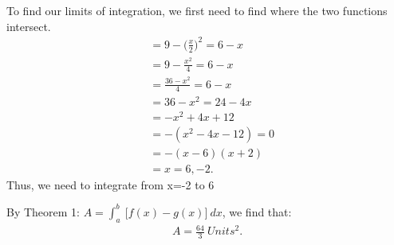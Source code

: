 \documentclass{report}
\begin{document}
    \begin{minipage}{0.47\textwidth}
        To find our limits of integration, we first need to find where the two functions intersect.
        \begin{align*}
            &=9 - \bigg(\frac{x}{2}\bigg)^{2} = 6-x \\
            &=9 - \frac{x^{2}}{4} = 6-x \\
            &=\frac{36-x^{2}}{4} = 6-x \\
            &= 36 -x^{2} = 24-4x \\
            &= -x^{2} +4x +12 \\
            &= -(x^{2}-4x-12) = 0 \\
            &= -(x-6)(x+2) \\
            &= x=6,-2
        .\end{align*}
        Thus, we need to integrate from x=-2 to 6
        \bigbreak \noindent 
    \end{minipage}
    \smallbreak \noindent
    By Theorem 1: $A = \int_{a}^{b}\ \big[f(x)-g(x)\big]\ dx $, we find that:
    \begin{align*}
        A = \frac{64}{3}\ Units^{2}
    .\end{align*}

    \pagebreak \bigbreak \noindent 
\end{document}
